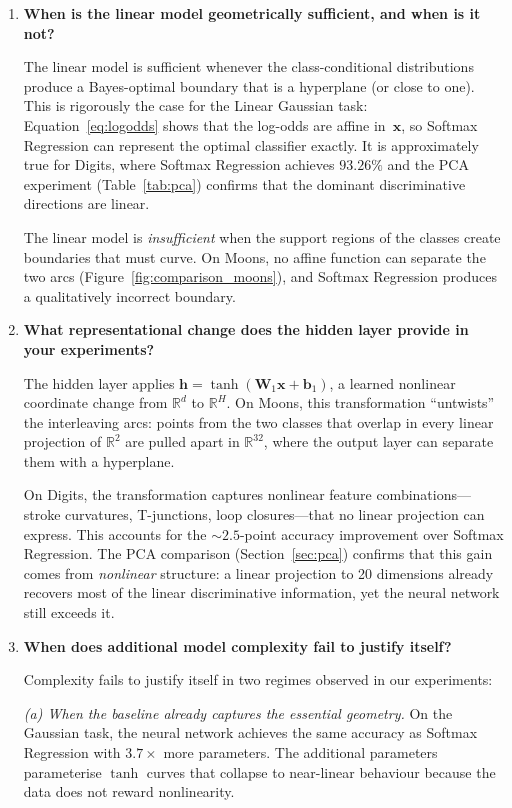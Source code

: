 \documentclass[11pt]{article}
\newcommand{\R}{\mathbb{R}}
\newcommand{\bx}{\mathbf{x}}
\newcommand{\bW}{\mathbf{W}}
\newcommand{\bb}{\mathbf{b}}
\newcommand{\bh}{\mathbf{h}}
\begin{document}
\begin{enumerate}[leftmargin=2em,itemsep=0.6em]

\item \textbf{When is the linear model geometrically sufficient, and when is it not?}

The linear model is sufficient whenever the class-conditional distributions produce a
Bayes-optimal boundary that is a hyperplane (or close to one).  This is rigorously the
case for the Linear Gaussian task: Equation~\eqref{eq:logodds} shows that the log-odds
are affine in~$\bx$, so Softmax Regression can represent the optimal classifier exactly.
It is approximately true for Digits, where Softmax Regression achieves $93.26\%$
and the PCA experiment (Table~\ref{tab:pca}) confirms that the dominant discriminative
directions are linear.

The linear model is \emph{insufficient} when the support regions of the classes create
boundaries that must curve.  On Moons, no affine function can separate the two arcs
(Figure~\ref{fig:comparison_moons}), and Softmax Regression produces a qualitatively
incorrect boundary.

\item \textbf{What representational change does the hidden layer provide in your experiments?}

The hidden layer applies $\bh = \tanh(\bW_1\bx+\bb_1)$, a learned nonlinear coordinate
change from $\R^d$ to $\R^H$.  On Moons, this transformation ``untwists'' the
interleaving arcs: points from the two classes that overlap in every linear projection of
$\R^2$ are pulled apart in $\R^{32}$, where the output layer can separate them with a
hyperplane.

On Digits, the transformation captures nonlinear feature combinations---stroke curvatures,
T-junctions, loop closures---that no linear projection can express.  This accounts for the
${\sim}2.5$-point accuracy improvement over Softmax Regression.  The PCA comparison
(Section~\ref{sec:pca}) confirms that this gain comes from \emph{nonlinear} structure:
a linear projection to 20 dimensions already recovers most of the linear discriminative
information, yet the neural network still exceeds it.

\item \textbf{When does additional model complexity fail to justify itself?}

Complexity fails to justify itself in two regimes observed in our experiments:

\emph{(a) When the baseline already captures the essential geometry.}  On the Gaussian
task, the neural network achieves the same accuracy as Softmax Regression with $3.7{\times}$
more parameters.  The additional parameters parameterise $\tanh$ curves that collapse to
near-linear behaviour because the data does not reward nonlinearity.


\end{enumerate}
\end{document}
